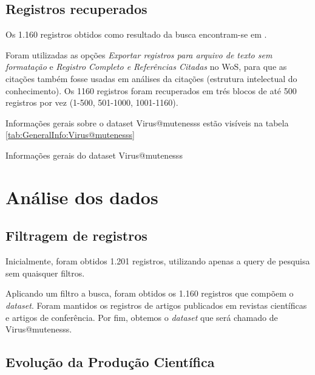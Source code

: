 \subsection{Registros recuperados}

Os 1.160 registros obtidos como resultado da busca encontram-se em \url{}. 

Foram utilizadas as opções \textit{Exportar registros para arquivo de texto sem formatação} e \textit{Registro Completo e Referências Citadas} no WoS, para que as citações também fosse usadas em análises da citações (estrutura intelectual do conhecimento). Os 1160 registros foram recuperados em trés blocos de até 500 registros por vez (1-500, 501-1000, 1001-1160).

Informações gerais sobre o dataset Virus@mutenesss estão visíveis na tabela \ref{tab:GeneralInfo:Virus@mutenesss}

\begin{table}[htp]
    \centering
    \caption{Informações gerais do dataset Virus@mutenesss}
    \label{tab:GeneralInfo:Virus@mutenesss}
\end{table}

\section{Análise dos dados}\label{Virus@mutenesss:analise}

\subsection{Filtragem de registros}
Inicialmente, foram obtidos 1.201 registros, utilizando apenas a query de pesquisa sem quaisquer filtros.

Aplicando um filtro a busca, foram obtidos os 1.160 registros que compõem o \textit{dataset}. Foram mantidos os registros de artigos publicados em revistas científicas e artigos de conferência. Por fim, obtemos o \textit{dataset} que será chamado de Virus@mutenesss.


\subsection{Evolução da Produção Científica}


